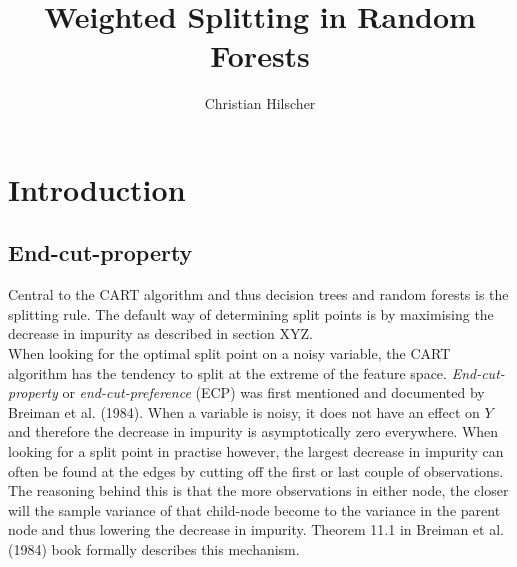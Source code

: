 \documentclass{article}
\title{Weighted Splitting in Random Forests}
\author{Christian Hilscher}
\begin{document}
\maketitle

\section{Introduction}





\subsection{End-cut-property}

Central to the CART algorithm and thus decision trees and random forests is the splitting rule. The default way of determining split points is by maximising the decrease in impurity as described in section XYZ. \\
When looking for the optimal split point on a noisy variable, the CART algorithm has the tendency to split at the extreme of the feature space. \textit{End-cut-property} or \textit{end-cut-preference} (ECP) was first mentioned and documented by Breiman et al. (1984). When a variable is noisy, it does not have an effect on $Y$ and therefore the decrease in impurity is asymptotically zero everywhere. When looking for a split point in practise however, the largest decrease in impurity can often be found at the edges by cutting off the first or last couple of observations. The reasoning behind this is that the more observations in either node, the closer will the sample variance of that child-node become to the variance in the parent node and thus lowering the decrease in impurity. Theorem 11.1 in Breiman et al. (1984) book formally describes this mechanism. \\
\end{document}
